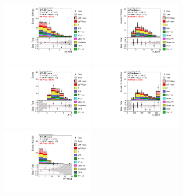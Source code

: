 \begin{figure}[h!]
  \centering
   \includegraphics[width=0.4\textwidth]{fig/analysis/BDTinputVarsInSR/DF_SR_FitRegion_DPhill_mh125_lin.pdf}
   \includegraphics[width=0.4\textwidth]{fig/analysis/BDTinputVarsInSR/DF_SR_FitRegion_Mll_mh125_lin.pdf}
   \includegraphics[width=0.4\textwidth]{fig/analysis/BDTinputVarsInSR/DF_SR_FitRegion_DYjj_mh125_lin.pdf}
   \includegraphics[width=0.4\textwidth]{fig/analysis/BDTinputVarsInSR/DF_SR_FitRegion_Mjj_mh125_lin.pdf}
   \includegraphics[width=0.4\textwidth]{fig/analysis/BDTinputVarsInSR/DF_SR_FitRegion_Pttot_tr_mh125_lin.pdf}

\end{figure}
